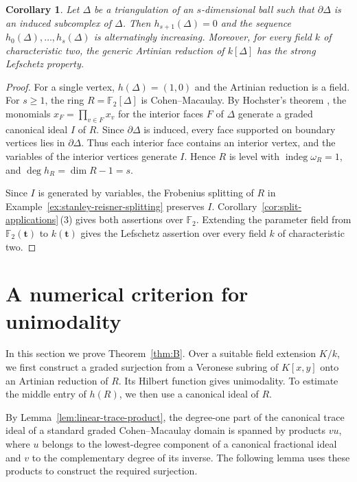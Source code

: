 \documentclass[a4paper,11pt]{amsart}
\DeclareMathOperator{\indeg}{indeg}
\newcommand{\kk}{k}
\newtheorem{corollary}[theorem]{Corollary}
\theoremstyle{definition}
\begin{document}
\begin{corollary}\label{cor:ball-induced-boundary}
Let $\Delta$ be a triangulation of an $s$-dimensional ball such that $\partial\Delta$ is an induced subcomplex of $\Delta$. Then $h_{s+1}(\Delta)=0$ and the sequence $h_0(\Delta),\ldots,h_s(\Delta)$ is alternatingly increasing. Moreover, for every field $\kk$ of characteristic two, the generic Artinian reduction of $\kk[\Delta]$ has the strong Lefschetz property.
\end{corollary}
\begin{proof}
For a single vertex, $h(\Delta)=(1,0)$ and the Artinian reduction is a field. For $s\ge1$, the ring $R=\mathbb F_2[\Delta]$ is Cohen--Macaulay. By Hochster's theorem \cite[Theorem~II.7.3]{S96}, the monomials $x_F=\prod_{v\in F}x_v$ for the interior faces $F$ of $\Delta$ generate a graded canonical ideal $I$ of $R$. Since $\partial\Delta$ is induced, every face supported on boundary vertices lies in $\partial\Delta$. Thus each interior face contains an interior vertex, and the variables of the interior vertices generate $I$. Hence $R$ is level with $\indeg\omega_R=1$, and $\deg h_R=\dim R-1=s$.

Since $I$ is generated by variables, the Frobenius splitting of $R$ in Example~\ref{ex:stanley-reisner-splitting} preserves $I$. Corollary~\ref{cor:split-applications}\,\textup{(3)} gives both assertions over $\mathbb F_2$. Extending the parameter field from $\mathbb F_2(\mathbf t)$ to $\kk(\mathbf t)$ gives the Lefschetz assertion over every field $\kk$ of characteristic two.
\end{proof}

\section{A numerical criterion for unimodality}\label{sec:domains}

In this section we prove Theorem~\ref{thm:B}. Over a suitable field extension $K/\kk$, we first construct a graded surjection from a Veronese subring of $K[x,y]$ onto an Artinian reduction of $R$. Its Hilbert function gives unimodality. To estimate the middle entry of $h(R)$, we then use a canonical ideal of $R$.

By Lemma~\ref{lem:linear-trace-product}, the degree-one part of the canonical trace ideal of a standard graded Cohen--Macaulay domain is spanned by products $vu$, where $u$ belongs to the lowest-degree component of a canonical fractional ideal and $v$ to the complementary degree of its inverse. The following lemma uses these products to construct the required surjection.
\end{document}
